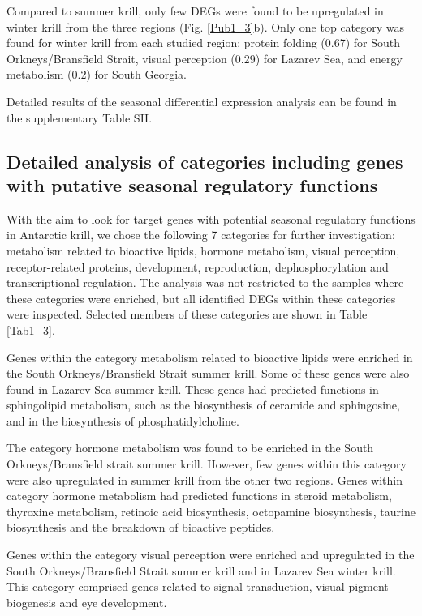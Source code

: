 Compared to summer krill, only few DEGs were found to be upregulated in winter
krill from the three regions (Fig. \ref{Pub1_3}b).  Only one top category was
found for winter krill from each studied region: protein folding (0.67) for
South Orkneys/Bransfield Strait, visual perception (0.29) for Lazarev Sea, and
energy metabolism (0.2) for South Georgia. 

Detailed  results of the seasonal differential expression analysis
can be found in the supplementary Table SII.

\subsection{Detailed analysis of categories including genes with putative seasonal regulatory functions}

With the aim to look for target genes with potential seasonal regulatory
functions in Antarctic krill, we chose the following 7 categories for further
investigation: metabolism related to bioactive lipids, hormone metabolism,
visual perception, receptor-related proteins, development, reproduction,
dephosphorylation and transcriptional regulation. The analysis was not
restricted to the samples where these categories were enriched, but all
identified DEGs within these categories were inspected. Selected members of
these categories are shown in Table \ref{Tab1_3}. 



Genes within the category metabolism related to bioactive lipids were enriched
in the South Orkneys/Bransfield Strait summer krill. Some of these genes were
also found in Lazarev Sea summer krill. These genes had predicted functions in
sphingolipid metabolism, such as the biosynthesis of ceramide and sphingosine,
and in the biosynthesis of phosphatidylcholine.

The category hormone metabolism was found to be enriched in the South
Ork\-neys/Brans\-field strait summer krill. However, few genes within this category
were also upregulated in summer krill from the other two regions. Genes within
category hormone metabolism had predicted functions in steroid metabolism,
thyroxine metabolism, retinoic acid biosynthesis, octopamine biosynthesis,
taurine biosynthesis and the breakdown of bioactive peptides.

Genes within the category visual perception were enriched and upregulated in
the South Orkneys/Bransfield Strait summer krill and in Lazarev Sea winter
krill. This category comprised genes related to signal transduction, visual
pigment biogenesis and eye development.

